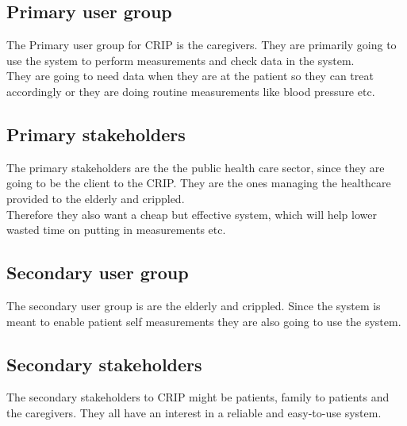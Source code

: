 \subsection{Primary user group}
The Primary user group for CRIP is the caregivers. They are primarily going to use the system to perform measurements and check data in the system.\\
They are going to need data when they are at the patient so they can treat accordingly or they are doing routine measurements like blood pressure etc.\\


\subsection{Primary stakeholders}
The primary stakeholders are the the public health care sector, since they are going to be the client to the CRIP. They are the ones managing the healthcare provided to the elderly and crippled.\\
Therefore they also want a cheap but effective system, which will help lower wasted time on putting in measurements etc.\\

\subsection{Secondary user group}
The secondary user group is are the elderly and crippled. Since the system is meant to enable patient self measurements they are also going to use the system.\\


\subsection{Secondary stakeholders}
The secondary stakeholders to CRIP might be patients, family to patients and the caregivers. They all have an interest in a reliable and easy-to-use system.\\
